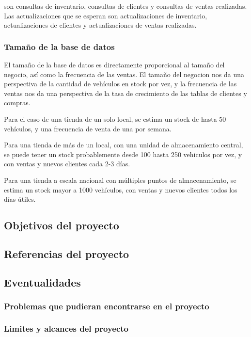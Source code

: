 \documentclass[12pt]{article}
\begin{document}
son consultas de inventario, consultas de clientes y consultas de ventas realizadas. Las actualizaciones que se esperan son actualizaciones de inventario, actualizaciones de clientes y actualizaciones de ventas realizadas.

\subsubsection{Tama\~no de la base de datos}

El tamaño de la base de datos es directamente proporcional al tamaño del negocio, así como la frecuencia de las ventas. El tamaño del negocion nos da una perspectiva de la cantidad de vehículos en stock por vez, y la frecuencia de las ventas nos da una perspectiva de la tasa de crecimiento de las tablas de clientes y compras.

Para el caso de una tienda de un solo local, se estima un stock de hasta 50 vehículos, y una frecuencia de venta de una por semana.

Para una tienda de más de un local, con una unidad de almacenamiento central, se puede tener un stock probablemente desde 100 hasta 250 vehiculos por vez, y con ventas y nuevos clientes cada 2-3 días.

Para una tienda a escala nacional con múltiples puntos de almacenamiento, se estima un stock mayor a 1000 vehículos, con ventas y nuevos clientes todos los días útiles.

\subsection{Objetivos del proyecto}
\subsection{Referencias del proyecto}
\subsection{Eventualidades}

\subsubsection{Problemas que pudieran encontrarse en el proyecto}
\subsubsection{Limites y alcances del proyecto}
\end{document}
